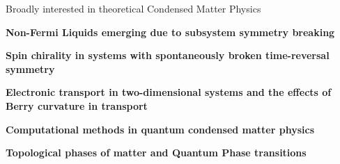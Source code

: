 

\begin{cventries}

  \cventry
    {} %
    {Broadly interested in theoretical Condensed Matter Physics} %
    {} %
    {} %
    {
      \begin{cvitems} %
      	\item {\textbf{Non-Fermi Liquids emerging due to subsystem symmetry breaking}}
      	\item {\textbf{Spin chirality in systems with spontaneously broken time-reversal symmetry}}
      	\item {\textbf{Electronic transport in two-dimensional systems and the effects of Berry curvature in transport}}
        \item {\textbf{Computational methods in quantum condensed matter physics}}
        \item {\textbf{Topological phases of matter and Quantum Phase transitions}}
      \end{cvitems}
    }

\end{cventries}
